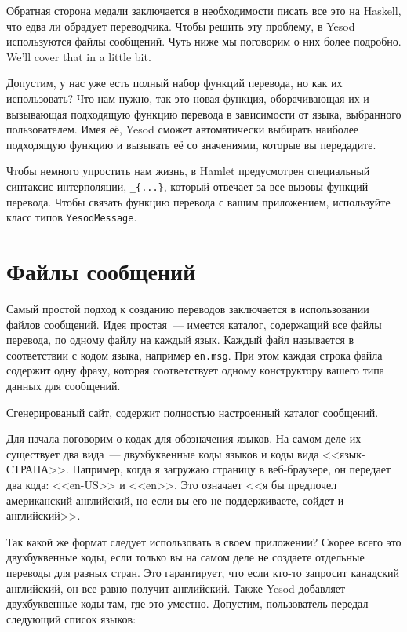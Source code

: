 Обратная сторона медали заключается в необходимости писать все это на Haskell,
что едва ли обрадует переводчика. Чтобы решить эту проблему, в Yesod
используются файлы сообщений. Чуть ниже мы поговорим о них более подробно. %
We'll cover that in a little bit.

Допустим, у нас уже есть полный набор функций перевода, но как их использовать?
Что нам нужно, так это новая функция, оборачивающая их и вызывающая подходящую
функцию перевода в зависимости от языка, выбранного пользователем. Имея её,
Yesod сможет автоматически выбирать наиболее подходящую функцию и вызывать её
со значениями, которые вы передадите.

Чтобы немного упростить нам жизнь, в Hamlet предусмотрен специальный синтаксис
интерполяции, \lstinline'_{...}', который отвечает за все вызовы функций
перевода. Чтобы связать функцию перевода с вашим приложением, используйте класс
типов \lstinline'YesodMessage'.

\section{Файлы сообщений} %

Самый простой подход к созданию переводов заключается в использовании файлов
сообщений. Идея простая~--- имеется каталог, содержащий все файлы перевода, по
одному файлу на каждый язык. Каждый файл называется в соответствии с кодом
языка, например \lstinline'en.msg'. При этом каждая строка файла содержит одну
фразу, которая соответствует одному конструктору вашего типа данных для
сообщений.

\begin{remark}
    Сгенерированый сайт, содержит полностью настроенный каталог сообщений. %
\end{remark}

Для начала поговорим о кодах для обозначения языков. На самом деле их
существует два вида~--- двухбуквенные коды языков и коды вида <<язык-СТРАНА>>.
Например, когда я загружаю страницу в веб-браузере, он передает два кода:
<<en-US>> и <<en>>. Это означает <<я бы предпочел американский английский, но
если вы его не поддерживаете, сойдет и английский>>.

Так какой же формат следует использовать в своем приложении? Скорее всего это
двухбуквенные коды, если только вы на самом деле не создаете отдельные переводы
для разных стран. Это гарантирует, что если кто-то запросит канадский
английский, он все равно получит английский. Также Yesod добавляет
двухбуквенные коды там, где это уместно. Допустим, пользователь передал
следующий список языков:

